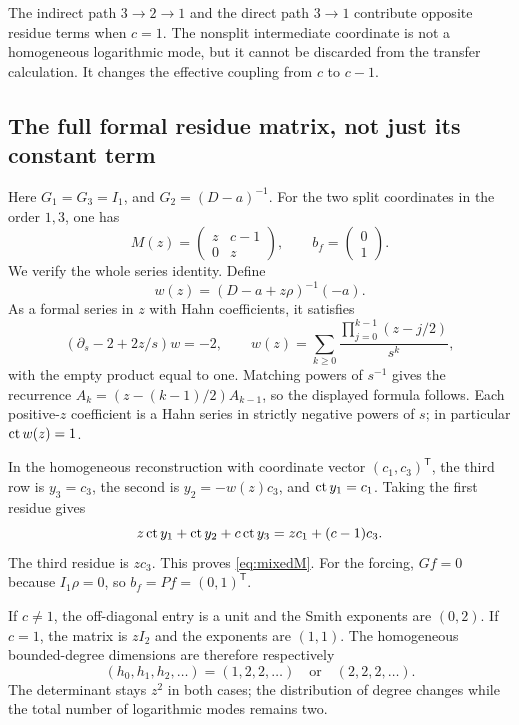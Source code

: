 \documentclass[11pt,a4paper]{article}
\numberwithin{equation}{section}
\theoremstyle{definition}
\theoremstyle{remark}\newtheorem{remark}[theorem]{Remark}
\begin{document}
The indirect path $3\to2\to1$ and the direct path $3\to1$ contribute opposite residue terms when $c=1$. The nonsplit intermediate coordinate is not a homogeneous logarithmic mode, but it cannot be discarded from the transfer calculation. It changes the effective coupling from $c$ to $c-1$.

\subsection{The full formal residue matrix, not just its constant term}
Here $G_1=G_3=I_1$, and $G_2=(D-a)^{-1}$. For the two split coordinates in the order $1,3$, one has
\begin{equation}
 M(z)=\begin{pmatrix}z&c-1\\0&z\end{pmatrix},
 \qquad b_f=\begin{pmatrix}0\\1\end{pmatrix}.
 \label{eq:mixedM}
\end{equation}
We verify the whole series identity. Define
\[
 w(z)=(D-a+z\rho)^{-1}(-a).
\]
As a formal series in $z$ with Hahn coefficients, it satisfies
\begin{equation}
 (\partial_s-2+2z/s)w=-2,
 \qquad
 w(z)=\sum_{k\ge0}\frac{\prod_{j=0}^{k-1}(z-j/2)}{s^k},
 \label{eq:w}
\end{equation}
with the empty product equal to one. Matching powers of $s^{-1}$ gives the recurrence
$A_k=(z-(k-1)/2)A_{k-1}$, so the displayed formula follows. Each positive-$z$ coefficient is a Hahn series in strictly negative powers of $s$; in particular $\operatorname{ct} w(z)=1$.

In the homogeneous reconstruction with coordinate vector $(c_1,c_3)^{\mathsf T}$, the third row is $y_3=c_3$, the second is $y_2=-w(z)c_3$, and $\operatorname{ct} y_1=c_1$. Taking the first residue gives
\[
 z\operatorname{ct} y_1+\operatorname{ct} y_2+c\operatorname{ct} y_3
 =zc_1+(c-1)c_3.
\]
The third residue is $zc_3$. This proves \eqref{eq:mixedM}. For the forcing, $Gf=0$ because $I_1\rho=0$, so $b_f=Pf=(0,1)^{\mathsf T}$.

If $c\ne1$, the off-diagonal entry is a unit and the Smith exponents are $(0,2)$. If $c=1$, the matrix is $zI_2$ and the exponents are $(1,1)$. The homogeneous bounded-degree dimensions are therefore respectively
\[
 (h_0,h_1,h_2,\ldots)=(1,2,2,\ldots)
 \quad\text{or}\quad(2,2,2,\ldots).
\]
The determinant stays $z^2$ in both cases; the distribution of degree changes while the total number of logarithmic modes remains two.
\end{document}
